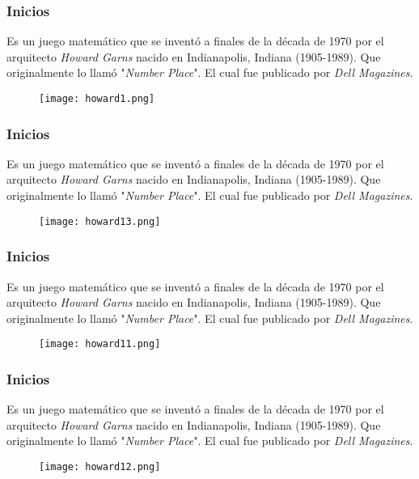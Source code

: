 \documentclass{beamer}
\begin{document}

\begin{frame}
\frametitle{Inicios}
 Es un juego matemático que se inventó a finales de la década de 1970 por el arquitecto \textit{Howard Garns} nacido en Indianapolis, Indiana (1905-1989). Que originalmente lo llamó "\textit{Number Place}". El cual fue publicado por \textit{Dell Magazines}.

\begin{figure}
\centering
  \texttt{[image: howard1.png]}
\end{figure}
\end{frame}


\begin{frame}
\frametitle{Inicios}
 Es un juego matemático que se inventó a finales de la década de 1970 por el arquitecto \textit{Howard Garns} nacido en Indianapolis, Indiana (1905-1989). Que originalmente lo llamó "\textit{Number Place}". El cual fue publicado por \textit{Dell Magazines}.

\begin{figure}
\centering
  \texttt{[image: howard13.png]}
\end{figure}
\end{frame}


\begin{frame}
\frametitle{Inicios}
 Es un juego matemático que se inventó a finales de la década de 1970 por el arquitecto \textit{Howard Garns} nacido en Indianapolis, Indiana (1905-1989). Que originalmente lo llamó "\textit{Number Place}". El cual fue publicado por \textit{Dell Magazines}.

\begin{figure}
\centering
  \texttt{[image: howard11.png]}
\end{figure}
\end{frame}


\begin{frame}
\frametitle{Inicios}
 Es un juego matemático que se inventó a finales de la década de 1970 por el arquitecto \textit{Howard Garns} nacido en Indianapolis, Indiana (1905-1989). Que originalmente lo llamó "\textit{Number Place}". El cual fue publicado por \textit{Dell Magazines}.

\begin{figure}
\centering
  \texttt{[image: howard12.png]}
\end{figure}
\end{frame}
\end{document}
